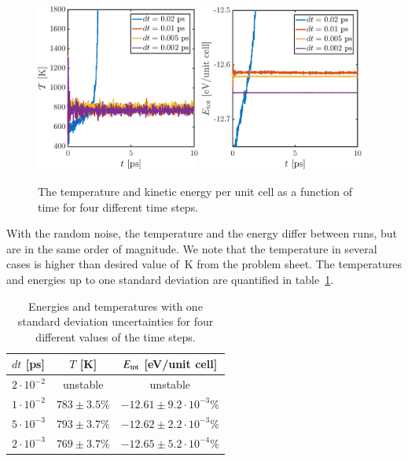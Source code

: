 \begin{figure}[!ht]
\begin{center}
  \includegraphics[width=0.48\textwidth]{../figures/dt-scan-temperature} 
    \includegraphics[width=0.48\textwidth]{../figures/dt-scan-energy} 
  \caption{The temperature and kinetic energy per unit cell as a function of time for four different time steps.}
  \label{fig:task2}
\end{center}
\end{figure}

With the random noise, the temperature and the energy differ between runs, but are in the same order of magnitude. 
We note that the temperature in several cases is higher than desired value of~\unit[600-800]{K} from the problem sheet. The temperatures and energies up to one standard deviation are quantified in table~\ref{tab:task2}.

\begin{table}[!ht]
  \begin{center}
    \caption{Energies and temperatures with one standard deviation uncertainties for four different values of the time steps.}
    \begin{tabular}{l c c} 
    $dt$ [ps] & $T$ [K] & $E_{\rm tot}$ [eV/unit cell]\\ \hline
$2 \cdot 10^{-2}$ & 	unstable &	unstable \\
$1\cdot 10^{-2}$ & 	$783 \pm 3.5\%$ &	$-12.61 \pm 9.2\cdot 10^{-3} \% $\\
$5\cdot 10^{-3}$ &	$793 \pm 3.7 \% $ &$-12.62 \pm 2.2\cdot 10^{-3} \%$ \\
$2\cdot 10^{-3}$ & $769  \pm 3.7 \% $ & 	$ -12.65 \pm 5.2\cdot 10^{-4} \% $\\ 
      \hline
    \end{tabular}
    \label{tab:task2}
  \end{center}
\end{table}


